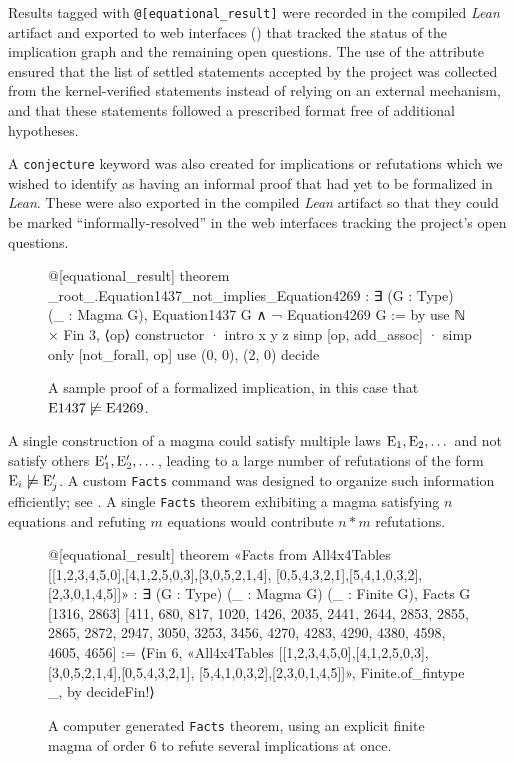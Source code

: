 Results tagged with \texttt{@{[}equational\_result{]}} were recorded in the compiled \emph{Lean} artifact and exported to web interfaces () that tracked the status of the implication graph and the remaining open questions.  The use of the attribute ensured that the list of settled statements accepted by the project was collected from the kernel-verified statements instead of relying on an external mechanism, and that these statements followed a prescribed format free of additional hypotheses.

A \texttt{conjecture} keyword was also created for implications or refutations which we wished to identify as having an informal proof that had yet to be formalized in \emph{Lean}.  These were also exported in the compiled \emph{Lean} artifact so that they could be marked ``informally-resolved'' in the web interfaces tracking the project's open questions.

\begin{figure}
\centering
\begin{lean}
@[equational_result]
theorem _root_.Equation1437_not_implies_Equation4269 :
    ∃ (G : Type) (_ : Magma G), Equation1437 G ∧ ¬ Equation4269 G := by
  use ℕ × Fin 3, ⟨op⟩
  constructor
  · intro x y z
    simp [op, add_assoc]
  · simp only [not_forall, op]
    use (0, 0), (2, 0)
    decide
\end{lean}
\caption{A sample proof of a formalized implication, in this case that $\mathrm{E}1437 \not\models \mathrm{E}4269$.}
\label{fig:impl}
\end{figure}

A single construction of a magma could satisfy multiple laws $\mathrm{E}_1,\mathrm{E}_2,\dots$ and not satisfy others $\mathrm{E}'_1, \mathrm{E}'_2, \dots$, leading to a large number of refutations of the form $\mathrm{E}_i \not\models \mathrm{E}'_j$.  A custom \texttt{Facts} command was designed to organize such information efficiently; see .  A single \texttt{Facts} theorem exhibiting a magma satisfying $n$ equations and refuting $m$ equations would contribute $n * m$ refutations.

\begin{figure}
\centering
\begin{lean}
@[equational_result]
theorem «Facts from All4x4Tables [[1,2,3,4,5,0],[4,1,2,5,0,3],[3,0,5,2,1,4],
[0,5,4,3,2,1],[5,4,1,0,3,2],[2,3,0,1,4,5]]» :
  ∃ (G : Type) (_ : Magma G) (_ : Finite G), Facts G [1316, 2863] [411, 680,
  817, 1020, 1426, 2035, 2441, 2644, 2853, 2855, 2865, 2872, 2947, 3050,
  3253, 3456, 4270, 4283, 4290, 4380, 4598, 4605, 4656] :=
⟨Fin 6, «All4x4Tables [[1,2,3,4,5,0],[4,1,2,5,0,3],[3,0,5,2,1,4],[0,5,4,3,2,1],
[5,4,1,0,3,2],[2,3,0,1,4,5]]», Finite.of_fintype _, by decideFin!⟩
\end{lean}
\caption{A computer generated \texttt{Facts} theorem, using an explicit finite magma of order $6$ to refute several implications at once.}
\label{fig:facts}
\end{figure}

